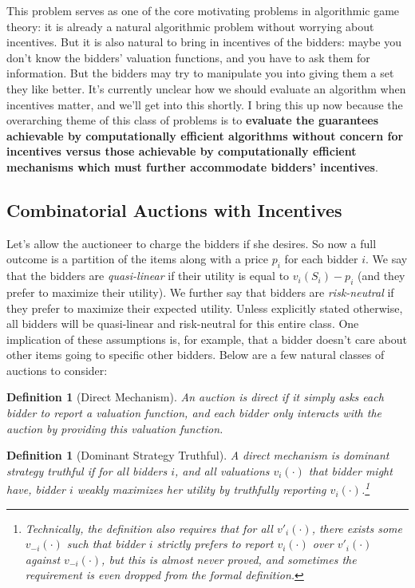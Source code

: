 \documentclass[12pt]{article}%
\newtheorem{definition}[theorem]{Definition}
\begin{document}
This problem serves as one of the core motivating problems in algorithmic game theory: it is already a natural algorithmic problem without worrying about incentives. But it is also natural to bring in incentives of the bidders: maybe you don't know the bidders' valuation functions, and you have to ask them for information. But the bidders may try to manipulate you into giving them a set they like better. It's currently unclear how we should evaluate an algorithm when incentives matter, and we'll get into this shortly. I bring this up now because the overarching theme of this class of problems is to \textbf{evaluate the guarantees achievable by computationally efficient algorithms without concern for incentives versus those achievable by computationally efficient mechanisms which must further accommodate bidders' incentives}. 

\subsection{Combinatorial Auctions with Incentives}
Let's allow the auctioneer to charge the bidders if she desires. So now a full outcome is a partition of the items along with a price $p_i$ for each bidder $i$. We say that the bidders are \emph{quasi-linear} if their utility is equal to $v_i(S_i) - p_i$ (and they prefer to maximize their utility). We further say that bidders are \emph{risk-neutral} if they prefer to maximize their expected utility. Unless explicitly stated otherwise, all bidders will be quasi-linear and risk-neutral for this entire class. One implication of these assumptions is, for example, that a bidder doesn't care about other items going to specific other bidders. Below are a few natural classes of auctions to consider:

\begin{definition}[Direct Mechanism] An auction is \emph{direct} if it simply asks each bidder to report a valuation function, and each bidder only interacts with the auction by providing this valuation function.
\end{definition}

\begin{definition}[Dominant Strategy Truthful] A direct mechanism is \emph{dominant strategy truthful} if for all bidders $i$, and all valuations $v_i(\cdot)$ that bidder might have, bidder $i$ weakly maximizes her utility by truthfully reporting $v_i(\cdot)$.\footnote{Technically, the definition also requires that for all $v'_i(\cdot)$, there exists some $v_{-i}(\cdot)$ such that bidder $i$ strictly prefers to report $v_i(\cdot)$ over $v'_i(\cdot)$ against $v_{-i}(\cdot)$, but this is almost never proved, and sometimes the requirement is even dropped from the formal definition.}
\end{definition}
\end{document}

